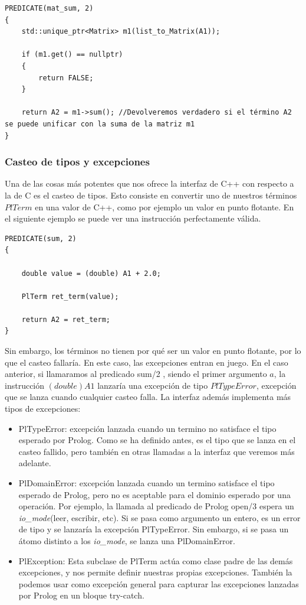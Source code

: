 \documentclass[a4paper]{article}
\begin{document}
\begin{lstlisting}[style=C++]
PREDICATE(mat_sum, 2)
{
    std::unique_ptr<Matrix> m1(list_to_Matrix(A1));
	
	if (m1.get() == nullptr)
	{
		return FALSE;
	}
	
	return A2 = m1->sum(); //Devolveremos verdadero si el término A2 se puede unificar con la suma de la matriz m1
}
\end{lstlisting}

\subsubsection{Casteo de tipos y excepciones}

Una de las cosas más potentes que nos ofrece la interfaz de C++ con respecto a la de C es el casteo de tipos. Esto consiste en convertir uno de nuestros términos $PlTerm$ en una valor de C++, como por ejemplo un valor en punto flotante. En el siguiente ejemplo se puede ver una instrucción perfectamente válida.

\begin{lstlisting}[style=C++]
PREDICATE(sum, 2)
{
	
	double value = (double) A1 + 2.0;
	
	PlTerm ret_term(value);
	
	return A2 = ret_term;
}
\end{lstlisting}

Sin embargo, los términos no tienen por qué ser un valor en punto flotante, por lo que el casteo fallaría. En este caso, las excepciones entran en juego.
En el caso anterior, si llamaramos al predicado sum/2 , siendo el primer argumento $a$, la instrucción $(double) A1$ lanzaría una excepción de tipo $PlTypeError$, excepción que se lanza cuando cualquier casteo falla. La interfaz además implementa más tipos de excepciones:

\begin{itemize}
\item PlTypeError: excepción lanzada cuando un termino no satisface el tipo esperado por Prolog. Como se ha definido antes, es el tipo que se lanza en el casteo fallido, pero también en otras llamadas a la interfaz que veremos más adelante.
\item PlDomainError: excepción lanzada cuando un termino satisface el tipo esperado de Prolog, pero no es aceptable para el dominio esperado por una operación. Por ejemplo, la llamada al predicado de Prolog open/3 espera un \textit{io\_mode}(leer, escribir, etc). Si se pasa como argumento un entero, es un error de tipo y se lanzaría la excepción PlTypeError. Sin embargo, si se pasa un átomo distinto a los \textit{io\_mode}, se lanza una PlDomainError.
\item PlException: Esta subclase de PlTerm actúa como clase padre de las demás excepciones, y nos permite definir nuestras propias excepciones. También la podemos usar como excepción general para capturar las excepciones lanzadas por Prolog en un bloque try-catch.
\end{itemize}
\end{document}
